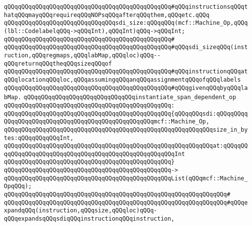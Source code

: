 \verb|qQQqqQQqqQQqqQQqqQQqqQQqqQQqqQQqqQQqqQQqqQQqqQQq#qQQqinstructionsqQQqthatqQQqmayqQQqrequireqQQqNOPsqQQqafterqQQqthem,qQQqetc.qQQq|\newline
\newline
\newline
\verb|qQQqqQQqqQQqqQQqqQQqqQQqqQQqqQQqsdi_size:qQQqqQQq(mcf::Machine_Op,qQQq(lbl::CodelabelqQQq->qQQqInt),qQQqInt)qQQq->qQQqInt;|\newline
\verb|qQQqqQQqqQQqqQQqqQQqqQQqqQQqqQQqqQQqqQQqqQQqqQQq#|\newline
\verb|qQQqqQQqqQQqqQQqqQQqqQQqqQQqqQQqqQQqqQQqqQQqqQQq#qQQqsdi_sizeqQQq(instruction,qQQqregmaps,qQQqlabMap,qQQqloc)qQQq--qQQqreturnqQQqtheqQQqsizeqQQqof|\newline
\verb|qQQqqQQqqQQqqQQqqQQqqQQqqQQqqQQqqQQqqQQqqQQqqQQq#qQQqinstructionqQQqatqQQqlocationqQQqloc,qQQqassumingqQQqanqQQqassignmentqQQqofqQQqlabels|\newline
\verb|qQQqqQQqqQQqqQQqqQQqqQQqqQQqqQQqqQQqqQQqqQQqqQQq#qQQqgivenqQQqbyqQQqlabMap.|\newline
\newline
\newline
\verb|qQQqqQQqqQQqqQQqqQQqqQQqqQQqqQQqinstantiate_span_dependent_op|\newline
\verb|qQQqqQQqqQQqqQQqqQQqqQQqqQQqqQQqqQQqqQQqqQQqqQQq:|\newline
\verb|qQQqqQQqqQQqqQQqqQQqqQQqqQQqqQQqqQQqqQQqqQQqqQQq{qQQqqQQqsdi:qQQqqQQqqQQqqQQqqQQqqQQqqQQqqQQqqQQqqQQqqQQqqQQqqQQqmcf::Machine_Op,|\newline
\verb|qQQqqQQqqQQqqQQqqQQqqQQqqQQqqQQqqQQqqQQqqQQqqQQqqQQqqQQqqQQqsize_in_bytes:qQQqqQQqqQQqInt,|\newline
\verb|qQQqqQQqqQQqqQQqqQQqqQQqqQQqqQQqqQQqqQQqqQQqqQQqqQQqqQQqqQQqat:qQQqqQQqqQQqqQQqqQQqqQQqqQQqqQQqqQQqqQQqqQQqqQQqqQQqqQQqInt|\newline
\verb|qQQqqQQqqQQqqQQqqQQqqQQqqQQqqQQqqQQqqQQqqQQqqQQq}|\newline
\verb|qQQqqQQqqQQqqQQqqQQqqQQqqQQqqQQqqQQqqQQqqQQqqQQq->|\newline
\verb|qQQqqQQqqQQqqQQqqQQqqQQqqQQqqQQqqQQqqQQqqQQqqQQqList(qQQqmcf::Machine_OpqQQq);|\newline
\verb|qQQqqQQqqQQqqQQqqQQqqQQqqQQqqQQqqQQqqQQqqQQqqQQqqQQqqQQqqQQqqQQq#|\newline
\verb|qQQqqQQqqQQqqQQqqQQqqQQqqQQqqQQqqQQqqQQqqQQqqQQqqQQqqQQqqQQqqQQq#qQQqexpandqQQq(instruction,qQQqsize,qQQqloc)qQQq-qQQqexpandsqQQqsdiqQQqinstructionqQQqinstruction,|\newline
